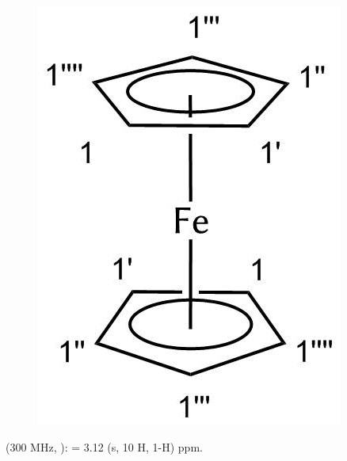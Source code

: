 \documentclass[12pt]{article}
\begin{document}
\begin{onehalfspace}
\begin{figure}[!htbp]
   \centering
\includegraphics[scale=0.4]{auswert.png}
\end{figure}
\noindent
\textbf{} (300 MHz, ): \ce{$\delta$} = 3.12 (s, 10 H, 1-H) ppm.

\end{onehalfspace}
\end{document}
